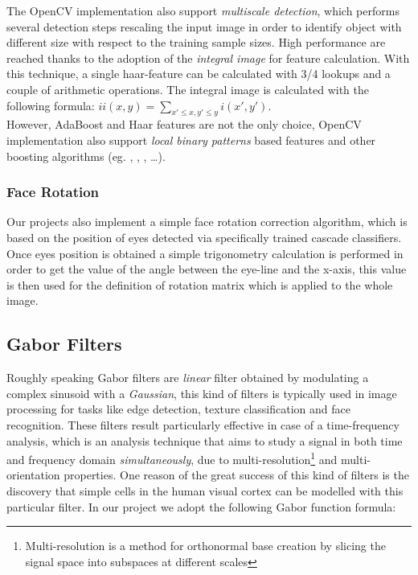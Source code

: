 The OpenCV implementation also support \emph{multiscale detection}, which performs several detection steps rescaling the input image in order to identify object with different size with respect to the training sample sizes. High performance are reached thanks to the adoption of the \emph{integral image} for feature calculation. With this technique, a single haar-feature can be calculated with 3/4 lookups and a couple of arithmetic operations. The integral image is calculated with the following formula: $ ii(x,y) = \sum_{x' \leq x, y' \leq y}{ i(x',y') } $.\\

However, AdaBoost and Haar features are not the only choice, OpenCV implementation also support \emph{local binary patterns} based features and other boosting algorithms (eg. , , , \ldots).


\subsubsection*{Face Rotation}

Our projects also implement a simple face rotation correction algorithm, which is based on the position of eyes detected via specifically trained cascade classifiers. Once eyes position is obtained a simple trigonometry calculation is performed in order to get the value of the angle between the eye-line and the x-axis, this value is then used for the definition of rotation matrix which is applied to the whole image.

\subsection{Gabor Filters}

Roughly speaking Gabor filters are \emph{linear} filter obtained by modulating a complex sinusoid with a \emph{Gaussian}, this kind of filters is typically used in image processing for tasks like edge detection, texture classification and face recognition\cite{gaborApplication}. These filters result particularly effective in case of a time-frequency analysis, which is an analysis technique that aims to study a signal in both time and frequency domain \emph{simultaneously}, due to multi-resolution\footnote{Multi-resolution is a method for orthonormal base creation by slicing the signal space into subspaces at different scales} and multi-orientation properties. One reason of the great success of this kind of filters is the discovery that simple cells in the human visual cortex can be modelled with this particular filter. In our project we adopt the following Gabor function formula:

